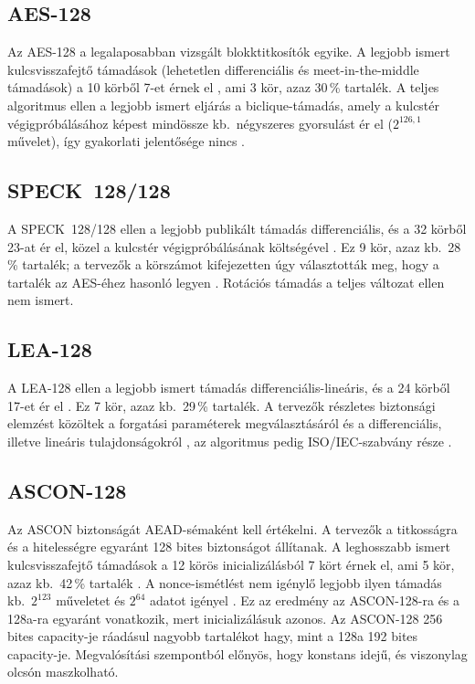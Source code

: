 \documentclass[a4paper,12pt]{report}
\theoremstyle{definition}
\theoremstyle{remark}
\begin{document}
\subsection{AES-128}

Az AES-128 a legalaposabban vizsgált blokktitkosítók egyike. A legjobb ismert kulcsvisszafejtő támadások (lehetetlen differenciális és meet-in-the-middle támadások) a 10 körből 7-et érnek el \cite{Derbez2013}, ami 3 kör, azaz 30\,\% tartalék. A teljes algoritmus ellen a legjobb ismert eljárás a biclique-támadás, amely a kulcstér végigpróbálásához képest mindössze kb.\ négyszeres gyorsulást ér el ($2^{126{,}1}$ művelet), így gyakorlati jelentősége nincs \cite{Bogdanov2011}.

\subsection{SPECK~128/128}

A SPECK~128/128 ellen a legjobb publikált támadás differenciális, és a 32 körből 23-at ér el, közel a kulcstér végigpróbálásának költségével \cite{Song2016}. Ez 9 kör, azaz kb.\ 28\,\% tartalék; a tervezők a körszámot kifejezetten úgy választották meg, hogy a tartalék az AES-éhez hasonló legyen \cite{Beaulieu2017}. Rotációs támadás a teljes változat ellen nem ismert.

\subsection{LEA-128}

A LEA-128 ellen a legjobb ismert támadás differenciális-lineáris, és a 24 körből 17-et ér el \cite{Chen2023}. Ez 7 kör, azaz kb.\ 29\,\% tartalék. A tervezők részletes biztonsági elemzést közöltek a forgatási paraméterek megválasztásáról és a differenciális, illetve lineáris tulajdonságokról \cite{Hong2013}, az algoritmus pedig ISO/IEC-szabvány része \cite{ISO29192}.

\subsection{ASCON-128}

Az ASCON biztonságát AEAD-sémaként kell értékelni. A tervezők a titkosságra és a hitelességre egyaránt 128 bites biztonságot állítanak. A leghosszabb ismert kulcsvisszafejtő támadások a 12 körös inicializálásból 7 kört érnek el, ami 5 kör, azaz kb.\ 42\,\% tartalék \cite{Dobraunig2021,Rohit2021}. A nonce-ismétlést nem igénylő legjobb ilyen támadás kb.\ $2^{123}$ műveletet és $2^{64}$ adatot igényel \cite{Rohit2021}. Ez az eredmény az ASCON-128-ra és a 128a-ra egyaránt vonatkozik, mert inicializálásuk azonos. Az ASCON-128 256 bites capacity-je ráadásul nagyobb tartalékot hagy, mint a 128a 192 bites capacity-je. Megvalósítási szempontból előnyös, hogy konstans idejű, és viszonylag olcsón maszkolható.
\end{document}
